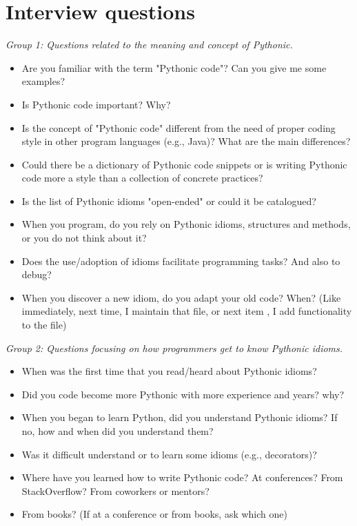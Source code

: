 \documentclass[a4paper]{article}
\begin{document}
\section{Interview questions}
\textit{Group 1: Questions related to the meaning and concept of Pythonic.}
\begin{itemize}
   \item Are you familiar with the term "Pythonic code"? Can you give me some examples?
  
  \item Is Pythonic code important? Why?
  
  \item Is the concept of "Pythonic code" different from the need of proper coding style in other program languages (e.g., Java)? What are the main differences?
  \item Could there be a dictionary of Pythonic code snippets or is writing Pythonic code more a style than a collection of concrete practices?
  \item Is the list of Pythonic idioms "open-ended" or could it be catalogued?
  \item When you program, do you rely on Pythonic idioms, structures and methods, or you do not think about it?
  \item Does the use/adoption of idioms facilitate programming tasks? And also to debug?
  \item When you discover a new idiom, do you adapt your old code? When? (Like immediately, next time, I maintain that file, or next item , I add functionality to the file)
\end{itemize}

\textit{Group 2: Questions focusing on how programmers get to know Pythonic idioms.}
\begin{itemize}
  \item When was the first time that you read/heard about Pythonic idioms?
  \item Did you code become more Pythonic with more experience and years? why?
  \item When you began to learn Python, did you understand Pythonic idioms? If no, how and when did you understand them?
  \item Was it difficult understand or to learn some idioms (e.g., decorators)?
  \item Where have you learned how to write Pythonic code? At conferences? From StackOverflow? From coworkers or mentors? \item From books? (If at a conference or from books, ask which one)
\end{itemize}
\end{document}
